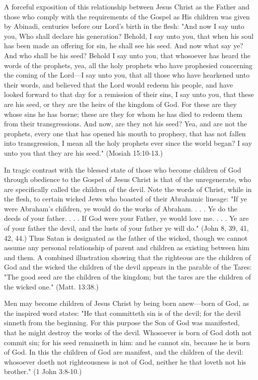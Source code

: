 A forceful exposition of this relationship between Jesus Christ as the Father and those who
comply with the requirements of the Gospel as His children was given by Abinadi, centuries
before our Lord's birth in the flesh: "And now I say unto you, Who shall declare his
generation? Behold, I say unto you, that when his soul has been made an offering for sin, he
shall see his seed. And now what say ye? And who shall be his seed? Behold I say unto you,
that whosoever has heard the words of the prophets, yea, all the holy prophets who have
prophesied concerning the coming of the Lord—I say unto you, that all those who have
hearkened unto their words, and believed that the Lord would redeem his people, and have
looked forward to that day for a remission of their sins, I say unto you, that these are his seed,
or they are the heirs of the kingdom of God. For these are they whose sins he has borne; these
are they for whom he has died to redeem them from their transgressions. And now, are they
not his seed? Yea, and are not the prophets, every one that has opened his mouth to prophesy,
that has not fallen into transgression, I mean all the holy prophets ever since the world
began? I say unto you that they are his seed." (Mosiah 15:10-13.)

In tragic contrast with the blessed state of those who become children of God through
obedience to the Gospel of Jesus Christ is that of the unregenerate, who are specifically
called the children of the devil. Note the words of Christ, while in the flesh, to certain wicked
Jews who boasted of their Abrahamic lineage: "If ye were Abraham's children, ye would do
the works of Abraham. . . . Ye do the deeds of your father. . . . If God were your Father, ye
would love me. . . . Ye are of your father the devil, and the lusts of your father ye will do."
(John 8, 39, 41, 42, 44.) Thus Satan is designated as the father of the wicked, though we
cannot assume any personal relationship of parent and children as existing between him and
them. A combined illustration showing that the righteous are the children of God and the
wicked the children of the devil appears in the parable of the Tares: "The good seed are the
children of the kingdom; but the tares are the children of the wicked one." (Matt. 13:38.)

Men may become children of Jesus Christ by being born anew—born of God, as the inspired
word states: "He that committeth sin is of the devil; for the devil sinneth from the beginning.
For this purpose the Son of God was manifested, that he might destroy the works of the devil.
Whosoever is born of God doth not commit sin; for his seed remaineth in him: and he cannot
sin, because he is born of God. In this the children of God are manifest, and the children of
the devil: whosoever doeth not righteousness is not of God, neither he that loveth not his
brother." (1 John 3:8-10.)

